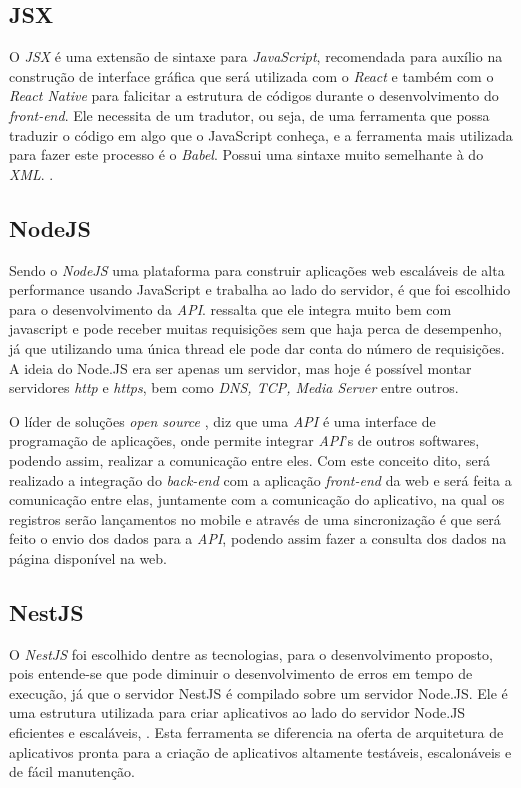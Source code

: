 \subsection{JSX}
O \textit{JSX} é uma extensão de sintaxe para \textit{JavaScript}, recomendada para auxílio na construção de interface gráfica que será utilizada com o \textit{React} e também com o \textit{React Native} para falicitar a estrutura de códigos durante o desenvolvimento do \textit{front-end}. Ele necessita de um tradutor, ou seja, de uma ferramenta que possa traduzir o código em algo que o JavaScript conheça, e a ferramenta mais utilizada para fazer este processo é o \textit{Babel}. Possui uma sintaxe muito semelhante à do \textit{XML}.  
\cite{jsx}.

\subsection{NodeJS}
Sendo o \textit{NodeJS} uma plataforma para construir aplicações web escaláveis de alta performance usando JavaScript e trabalha ao lado do servidor, é que foi escolhido para o desenvolvimento da \textit{API}.  ressalta que ele integra muito bem com javascript e pode receber muitas requisições sem que haja perca de desempenho, já que utilizando uma única thread ele pode dar conta do número de requisições. A ideia do Node.JS era ser apenas um servidor, mas hoje é possível montar servidores \textit{http} e \textit{https}, bem como \textit{DNS, TCP, Media Server} entre outros.

O líder de soluções \textit{open source} , diz que uma \textit{API} é uma interface de programação de aplicações, onde permite integrar \textit{API}'s de outros softwares, podendo assim, realizar a comunicação entre eles. Com este conceito dito, será realizado a integração do \textit{back-end} com a aplicação \textit{front-end} da web e será feita a comunicação entre elas, juntamente com a comunicação do aplicativo, na qual os registros serão lançamentos no mobile e através de uma sincronização é que será feito o envio dos dados para a \textit{API}, podendo assim fazer a consulta dos dados na página disponível na web.

\subsection{NestJS}
O \textit{NestJS} foi escolhido dentre as tecnologias, para o desenvolvimento proposto, pois entende-se que pode diminuir o desenvolvimento de erros em tempo de execução, já que o servidor NestJS é compilado sobre um servidor Node.JS. Ele é uma estrutura utilizada para criar aplicativos ao lado do servidor Node.JS eficientes e escaláveis, . Esta ferramenta se diferencia na oferta de arquitetura de aplicativos pronta para a criação de aplicativos altamente testáveis, escalonáveis e de fácil manutenção.

